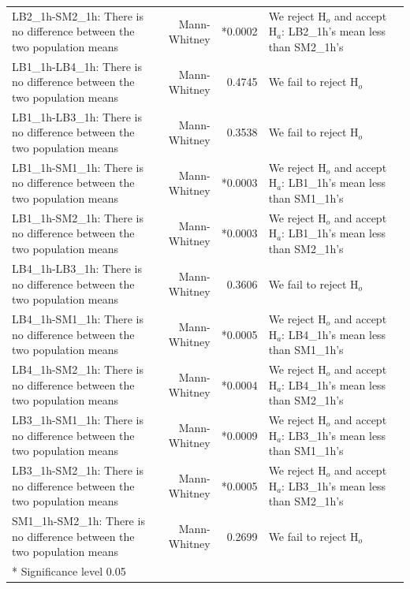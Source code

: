 \begin{table}[H]
{\begin{tabular}{>{\RaggedRight}p{5.5cm}rr>{\RaggedRight}p{5.5cm}r}
LB2\_1h-SM2\_1h: There is no difference between the two population means & Mann-Whitney & *0.0002 & We reject $\text{H}_o$ and accept $\text{H}_a$: LB2\_1h's mean less than SM2\_1h's \\
LB1\_1h-LB4\_1h: There is no difference between the two population means & Mann-Whitney & 0.4745 & We fail to reject $\text{H}_o$ \\
LB1\_1h-LB3\_1h: There is no difference between the two population means & Mann-Whitney & 0.3538 & We fail to reject $\text{H}_o$ \\
LB1\_1h-SM1\_1h: There is no difference between the two population means & Mann-Whitney & *0.0003 & We reject $\text{H}_o$ and accept $\text{H}_a$: LB1\_1h's mean less than SM1\_1h's \\
LB1\_1h-SM2\_1h: There is no difference between the two population means & Mann-Whitney & *0.0003 & We reject $\text{H}_o$ and accept $\text{H}_a$: LB1\_1h's mean less than SM2\_1h's \\
LB4\_1h-LB3\_1h: There is no difference between the two population means & Mann-Whitney & 0.3606 & We fail to reject $\text{H}_o$ \\
LB4\_1h-SM1\_1h: There is no difference between the two population means & Mann-Whitney & *0.0005 & We reject $\text{H}_o$ and accept $\text{H}_a$: LB4\_1h's mean less than SM1\_1h's \\
LB4\_1h-SM2\_1h: There is no difference between the two population means & Mann-Whitney & *0.0004 & We reject $\text{H}_o$ and accept $\text{H}_a$: LB4\_1h's mean less than SM2\_1h's \\
LB3\_1h-SM1\_1h: There is no difference between the two population means & Mann-Whitney & *0.0009 & We reject $\text{H}_o$ and accept $\text{H}_a$: LB3\_1h's mean less than SM1\_1h's \\
LB3\_1h-SM2\_1h: There is no difference between the two population means & Mann-Whitney & *0.0005 & We reject $\text{H}_o$ and accept $\text{H}_a$: LB3\_1h's mean less than SM2\_1h's \\
SM1\_1h-SM2\_1h: There is no difference between the two population means & Mann-Whitney & 0.2699 & We fail to reject $\text{H}_o$ \\
\bottomrule
*  Significance level 0.05
\end{tabular}
}
\end{table}


